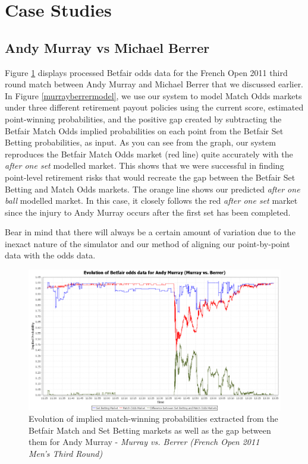 \documentclass[letterpaper,12pt]{article}
\begin{document}
\section{Case Studies}

\subsection{Andy Murray vs Michael Berrer}

Figure \ref{murrayberrer2} displays processed Betfair odds data for the French Open 2011 third round match between Andy Murray and Michael Berrer that we discussed earlier.  In Figure \ref{murrayberrermodel}, we use our system to model Match Odds markets under three different retirement payout policies using the current score, estimated point-winning probabilities, and the positive gap created by subtracting the Betfair Match Odds implied probabilities on each point from the Betfair Set Betting probabilities, as input.  As you can see from the graph, our system reproduces the Betfair Match Odds market (red line) quite accurately with the \textit{after one set} modelled market.  This shows that we were successful in finding point-level retirement risks that would recreate the gap between the Betfair Set Betting and Match Odds markets.  The orange line shows our predicted \textit{after one ball} modelled market.  In this case, it closely follows the red \textit{after one set} market since the injury to Andy Murray occurs after the first set has been completed.

Bear in mind that there will always be a certain amount of variation due to the inexact nature of the simulator and our method of aligning our point-by-point data with the odds data.

\begin{figure}[H]
  \centering \includegraphics[width=12.3cm]{matches/murrayberrer}
  \caption{Evolution of implied match-winning probabilities extracted from the Betfair Match and Set Betting markets as well as the gap between them for Andy Murray - \textit{Murray vs. Berrer (French Open 2011 Men's Third Round)}}
  \label{murrayberrer2}
\end{figure}
\end{document}
